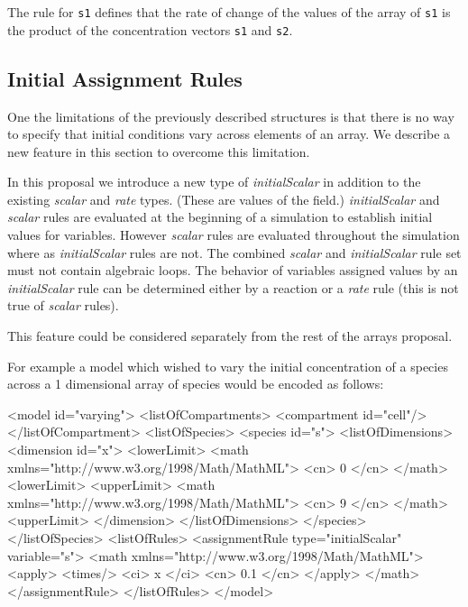 \documentclass{cekarticle}
\begin{document}
The rule for \texttt{s1} defines that the rate of change of the
values of the array of \texttt{s1} is the product of the concentration vectors
\texttt{s1} and \texttt{s2}.

\subsection{Initial Assignment Rules}

One the limitations of the previously described structures is that there is no way to 
specify that initial conditions vary across elements of an array.  We describe a new feature
in this section to overcome this limitation.

In this proposal we introduce a new type of  \emph{initialScalar} in addition
to the existing \emph{scalar} and \emph{rate} types.  (These are values of the  field.)
\emph{initialScalar} and \emph{scalar} rules are evaluated at the beginning of a simulation to establish
initial values for variables.  However \emph{scalar} rules are evaluated throughout the simulation
where as \emph{initialScalar} rules are not.  The combined \emph{scalar} and \emph{initialScalar} rule
set must not contain algebraic loops.  The behavior of variables assigned values by an
\emph{initialScalar} rule can be determined either by a reaction  or a \emph{rate} rule (this is not
true of \emph{scalar} rules).

This feature could be considered separately from the rest of the arrays proposal.

For example a model which wished to vary the initial concentration of a species
across a 1 dimensional array of species would be encoded as follows:

\begin{example}
<model id="varying">
    <listOfCompartments>
        <compartment id="cell"/>
    </listOfCompartment>
    <listOfSpecies>
        <species id="s">
            <listOfDimensions>
                <dimension id="x">
                    <lowerLimit>
                        <math xmlns="http://www.w3.org/1998/Math/MathML">
                            <cn> 0 </cn>
                        </math>
                    <lowerLimit>
                    <upperLimit>
                        <math xmlns="http://www.w3.org/1998/Math/MathML">
                            <cn> 9 </cn>
                        </math>
                    <upperLimit>
                </dimension>
            </listOfDimensions>
        </species>
    </listOfSpecies>
    <listOfRules>
        <assignmentRule type="initialScalar" variable="s">
            <math xmlns="http://www.w3.org/1998/Math/MathML">
                <apply>
                    <times/>
                    <ci> x </ci>
                    <cn> 0.1 </cn>
                </apply>
            </math>
        </assignmentRule>
    </listOfRules>
</model>
\end{example}
\end{document}
